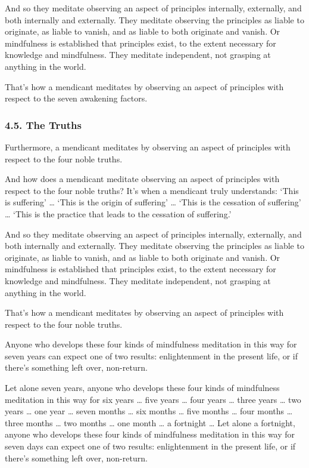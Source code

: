 \documentclass[12pt,openany]{book}%
\begin{document}
And so they meditate observing an aspect of principles internally, externally, and both internally and externally. They meditate observing the principles as liable to originate, as liable to vanish, and as liable to both originate and vanish. Or mindfulness is established that principles exist, to the extent necessary for knowledge and mindfulness. They meditate independent, not grasping at anything in the world. 

That’s how a mendicant meditates by observing an aspect of principles with respect to the seven awakening factors. 

\subsubsection*{4.5. The Truths }

Furthermore, a mendicant meditates by observing an aspect of principles with respect to the four noble truths. 

And how does a mendicant meditate observing an aspect of principles with respect to the four noble truths? It’s when a mendicant truly understands: ‘This is suffering’ … ‘This is the origin of suffering’ … ‘This is the cessation of suffering’ … ‘This is the practice that leads to the cessation of suffering.’ 

And so they meditate observing an aspect of principles internally, externally, and both internally and externally. They meditate observing the principles as liable to originate, as liable to vanish, and as liable to both originate and vanish. Or mindfulness is established that principles exist, to the extent necessary for knowledge and mindfulness. They meditate independent, not grasping at anything in the world. 

That’s how a mendicant meditates by observing an aspect of principles with respect to the four noble truths. 

Anyone who develops these four kinds of mindfulness meditation in this way for seven years can expect one of two results: enlightenment in the present life, or if there’s something left over, non-return. 

Let alone seven years, anyone who develops these four kinds of mindfulness meditation in this way for six years … five years … four years … three years … two years … one year … seven months … six months … five months … four months … three months … two months … one month … a fortnight … Let alone a fortnight, anyone who develops these four kinds of mindfulness meditation in this way for seven days can expect one of two results: enlightenment in the present life, or if there’s something left over, non-return. 
\end{document}
